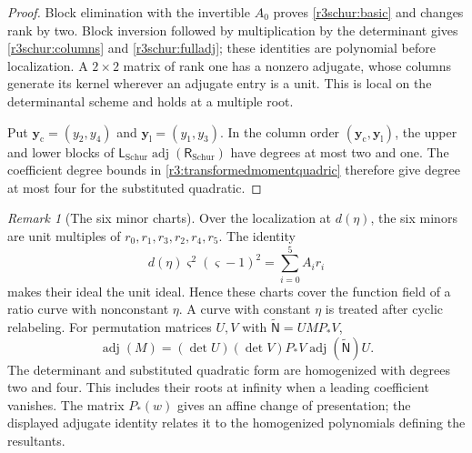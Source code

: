 \documentclass[11pt,a4paper]{article}
\numberwithin{equation}{section}
\theoremstyle{plain}
\theoremstyle{definition}
\theoremstyle{remark}
\newtheorem{remark}[theorem]{Remark}
\begin{document}
\begin{proof}
Block elimination with the invertible $A_0$ proves
\eqref{r3schur:basic} and changes rank by two.
Block inversion followed by multiplication by the determinant gives
\eqref{r3schur:columns} and \eqref{r3schur:fulladj}; these identities
are polynomial before localization.
A $2\times2$ matrix of rank one has a nonzero adjugate, whose columns
generate its kernel wherever an adjugate entry is a unit.
This is local on the determinantal scheme and holds at a multiple root.

Put $\mathbf y_{\mathrm c}=(y_2,y_4)$ and
$\mathbf y_{\mathrm l}=(y_1,y_3)$.
In the column order $(\mathbf y_{\mathrm c},\mathbf y_{\mathrm l})$,
the upper and lower blocks of $\mathsf L_{\mathrm{Schur}}\operatorname{adj}(\mathsf R_{\mathrm{Schur}})$
have degrees at most two and one. The coefficient degree bounds in
\eqref{r3:transformedmomentquadric} therefore give degree at most four
for the substituted quadratic.
\end{proof}

\begin{remark}[The six minor charts]
Over the localization at $d(\eta)$, the six minors are unit multiples
of $r_0,r_1,r_3,r_2,r_4,r_5$.
The identity
\[
 d(\eta )\varsigma ^2(\varsigma -1)^2=\sum_{i=0}^{5}A_i r_i
\]
makes their ideal the unit ideal. Hence these charts cover the
function field of a ratio curve with nonconstant $\eta$.
A curve with constant $\eta$ is treated after cyclic relabeling.
For permutation matrices $U,V$ with $\widetilde{\mathsf N}=UMP_*V$,
\[
 \operatorname{adj}(M)
  =(\det U)(\det V)P_*V\operatorname{adj}(\widetilde{\mathsf N})U.
\]
The determinant and substituted quadratic form are homogenized
with degrees two and four. This includes their roots at infinity
when a leading coefficient vanishes.
The matrix $P_*(w)$ gives an affine change of presentation;
the displayed adjugate identity relates it to the homogenized
polynomials defining the resultants.
\end{remark}
\end{document}
